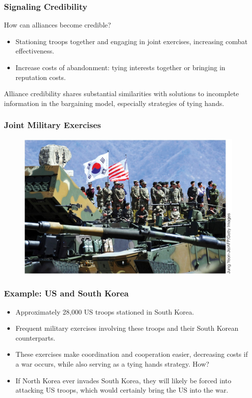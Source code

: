 \documentclass[handout]{beamer}
\begin{document}
\begin{frame} 
	\frametitle{\LARGE{Signaling Credibility}}
How can alliances become credible?
	\begin{itemize}
		\item Stationing troops together and engaging in joint exercises, increasing combat effectiveness. \pause  
		\item Increase costs of abandonment: tying interests together or bringing in reputation costs. \pause 
	\end{itemize}
Alliance credibility shares substantial similarities with solutions to incomplete information in the bargaining model, especially strategies of tying hands.	
\end{frame}

\begin{frame} 
	\frametitle{\LARGE{Joint Military Exercises}}
	\begin{figure}[ht!]
		\centering
		\includegraphics[width=\textwidth,height=\textheight,keepaspectratio]{USandSKjoint.jpg}
	\end{figure}
\end{frame}

\begin{frame} 
	\frametitle{\LARGE{Example: US and South Korea}}
	\begin{itemize}
		\item Approximately 28,000 US troops stationed in South Korea. \pause  
		\item Frequent military exercises involving these troops and their South Korean counterparts. \pause 
		\item These exercises make coordination and cooperation easier, decreasing costs if a war occurs, while also serving as a tying hands strategy. How? \pause
		\item If North Korea ever invades South Korea, they will likely be forced into attacking US troops, which would certainly bring the US into the war.
	\end{itemize}
\end{frame}
\end{document}
